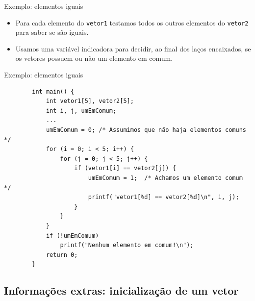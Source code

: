 \documentclass[handout]{beamer}
\newcommand{\cod}[1]{\texttt{#1}}
\begin{document}
\begin{frame}[fragile]{Exemplo: elementos iguais}

    \begin{itemize}
        \item Para cada elemento do \cod{vetor1} testamos todos os outros elementos do \cod{vetor2} para saber se são iguais.
        \item Usamos uma variável indicadora para decidir, ao final dos laços encaixados, se os vetores possuem ou não um elemento em comum.
    \end{itemize}

\end{frame}

\begin{frame}[fragile]{Exemplo: elementos iguais}

    \begin{verbatim}
        int main() {
            int vetor1[5], vetor2[5];
            int i, j, umEmComum;
            ...
            umEmComum = 0; /* Assumimos que não haja elementos comuns */
            for (i = 0; i < 5; i++) {
                for (j = 0; j < 5; j++) {
                    if (vetor1[i] == vetor2[j]) {
                        umEmComum = 1;  /* Achamos um elemento comum */
                        printf("vetor1[%d] == vetor2[%d]\n", i, j);
                    }
                }
            }
            if (!umEmComum)
                printf("Nenhum elemento em comum!\n");
            return 0;
        }
    \end{verbatim}

\end{frame}


\subsection{Informações extras: inicialização de um vetor}
\end{document}
